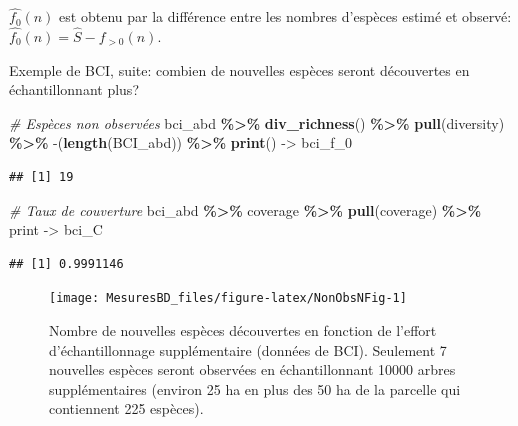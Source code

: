 \documentclass[
  11pt,
  american,
  a4paper,
  extrafontsizes,onecolumn,openright
  ]{memoir}
\newenvironment{Shaded}{\begin{snugshade}}{\end{snugshade}}
\newcommand{\AttributeTok}[1]{\textcolor[rgb]{0.13,0.29,0.53}{#1}}
\newcommand{\CommentTok}[1]{\textcolor[rgb]{0.56,0.35,0.01}{\textit{#1}}}
\newcommand{\FunctionTok}[1]{\textcolor[rgb]{0.13,0.29,0.53}{\textbf{#1}}}
\newcommand{\NormalTok}[1]{#1}
\newcommand{\OtherTok}[1]{\textcolor[rgb]{0.56,0.35,0.01}{#1}}
\newcommand{\SpecialCharTok}[1]{\textcolor[rgb]{0.81,0.36,0.00}{\textbf{#1}}}
\newcommand{\StringTok}[1]{\textcolor[rgb]{0.31,0.60,0.02}{#1}}
\begin{document}
\(\hat{f_0}(n)\) est obtenu par la différence entre les nombres d'espèces estimé et observé: \(\hat{f_0}(n) = \hat{S} - f_{>0}(n)\).

Exemple de BCI, suite: combien de nouvelles espèces seront découvertes en échantillonnant plus?

\scriptsize

\begin{Shaded}
\begin{Highlighting}[]
\CommentTok{\# Espèces non observées}
\NormalTok{bci\_abd }\SpecialCharTok{\%\textgreater{}\%} 
  \FunctionTok{div\_richness}\NormalTok{() }\SpecialCharTok{\%\textgreater{}\%} 
  \FunctionTok{pull}\NormalTok{(diversity) }\SpecialCharTok{\%\textgreater{}\%} 
  \StringTok{\textasciigrave{}}\AttributeTok{{-}}\StringTok{\textasciigrave{}}\NormalTok{(}\FunctionTok{length}\NormalTok{(BCI\_abd)) }\SpecialCharTok{\%\textgreater{}\%} 
  \FunctionTok{print}\NormalTok{() }\OtherTok{{-}\textgreater{}}
\NormalTok{  bci\_f\_0}
\end{Highlighting}
\end{Shaded}

\begin{verbatim}
## [1] 19
\end{verbatim}

\begin{Shaded}
\begin{Highlighting}[]
\CommentTok{\# Taux de couverture}
\NormalTok{bci\_abd }\SpecialCharTok{\%\textgreater{}\%} 
\NormalTok{  coverage }\SpecialCharTok{\%\textgreater{}\%} 
  \FunctionTok{pull}\NormalTok{(coverage) }\SpecialCharTok{\%\textgreater{}\%} 
\NormalTok{  print }\OtherTok{{-}\textgreater{}} 
\NormalTok{  bci\_C}
\end{Highlighting}
\end{Shaded}

\begin{verbatim}
## [1] 0.9991146
\end{verbatim}

\normalsize



\scriptsize

\begin{figure}

{\centering \texttt{[image: MesuresBD\_files/figure-latex/NonObsNFig-1]} 

}

\caption{Nombre de nouvelles espèces découvertes en fonction de l'effort d'échantillonnage supplémentaire (données de BCI). Seulement 7 nouvelles espèces seront observées en échantillonnant 10000 arbres supplémentaires (environ 25 ha en plus des 50 ha de la parcelle qui contiennent 225 espèces).}\label{fig:NonObsNFig}
\end{figure}
\end{document}
